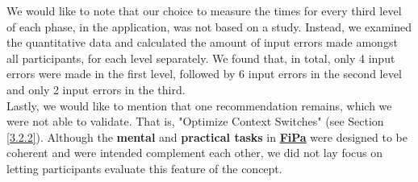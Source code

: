 We would like to note that our choice to measure the times for every third level of each phase, in the application, was not based on a study. Instead, we examined the quantitative data and calculated the amount of input errors made amongst all participants, for each level separately. We found that, in total, only 4 input errors were made in the first level, followed by 6 input errors in the second level and only 2 input errors in the third.\\

Lastly, we would like to mention that one recommendation remains, which we were not able to validate. That is, "Optimize Context Switches" (see Section \ref{3.2.2}). Although the \textbf{mental} and \textbf{practical tasks} in \underline{\textbf{FiPa}} were designed to be coherent and were intended complement each other, we did not lay focus on letting participants evaluate this feature of the concept.
